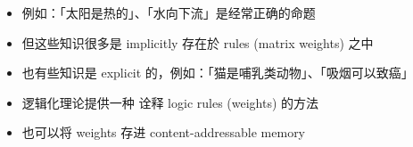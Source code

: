 \documentclass[16pt]{beamer}
\newcommand{\cc}[2]{#1}
\newcommand{\cc}[2]{#2}
\begin{document}
\begin{frame}[plain]
\begin{itemize}
	\item \cc{例如：「太阳是热的」、「水向下流」是经常正确的命题}{Eg. ``The sun is hot'', ``Water flows downhill'' are facts that stay constant}

	\item \cc{
	但这些知识很多是 implicitly 存在於 rules (matrix weights) 之中}{
	But some of this knowledge is implicitly stored as rules (matrix weights)
	}
	
	\item \cc{
	也有些知识是 explicit 的，例如：「猫是哺乳类动物」、「吸烟可以致癌」}{
	Some knowledge is explicit, eg: ``cats are mammals'', ``smoking can cause cancer''
	}
	
	\item \cc{
	逻辑化理论提供一种 诠释 logic rules (weights) 的方法}{
	Logicalization provides a way to interpret logic rules (weights)
	}
	
	\item \cc{
	也可以将 weights 存进 content-addressable memory}{
	We can also store rules (weights) into content-addressable memory
	}
\end{itemize}
\end{frame}
\end{document}
